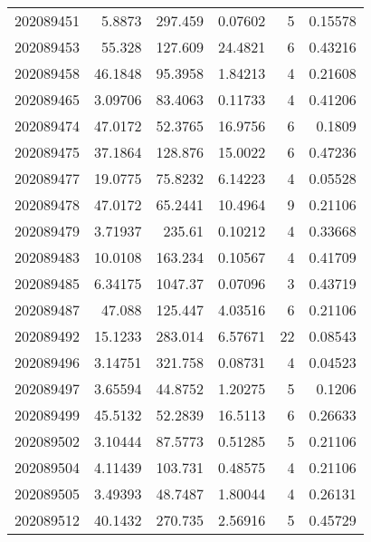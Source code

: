 \begin{tabular}{rrrrrr}
 202089451 &          5.8873  &      297.459  &            0.07602 &           5 & 0.15578 \\
 202089453 &         55.328   &      127.609  &           24.4821  &           6 & 0.43216 \\
 202089458 &         46.1848  &       95.3958 &            1.84213 &           4 & 0.21608 \\
 202089465 &          3.09706 &       83.4063 &            0.11733 &           4 & 0.41206 \\
 202089474 &         47.0172  &       52.3765 &           16.9756  &           6 & 0.1809  \\
 202089475 &         37.1864  &      128.876  &           15.0022  &           6 & 0.47236 \\
 202089477 &         19.0775  &       75.8232 &            6.14223 &           4 & 0.05528 \\
 202089478 &         47.0172  &       65.2441 &           10.4964  &           9 & 0.21106 \\
 202089479 &          3.71937 &      235.61   &            0.10212 &           4 & 0.33668 \\
 202089483 &         10.0108  &      163.234  &            0.10567 &           4 & 0.41709 \\
 202089485 &          6.34175 &     1047.37   &            0.07096 &           3 & 0.43719 \\
 202089487 &         47.088   &      125.447  &            4.03516 &           6 & 0.21106 \\
 202089492 &         15.1233  &      283.014  &            6.57671 &          22 & 0.08543 \\
 202089496 &          3.14751 &      321.758  &            0.08731 &           4 & 0.04523 \\
 202089497 &          3.65594 &       44.8752 &            1.20275 &           5 & 0.1206  \\
 202089499 &         45.5132  &       52.2839 &           16.5113  &           6 & 0.26633 \\
 202089502 &          3.10444 &       87.5773 &            0.51285 &           5 & 0.21106 \\
 202089504 &          4.11439 &      103.731  &            0.48575 &           4 & 0.21106 \\
 202089505 &          3.49393 &       48.7487 &            1.80044 &           4 & 0.26131 \\
 202089512 &         40.1432  &      270.735  &            2.56916 &           5 & 0.45729 \\

\end{tabular}
